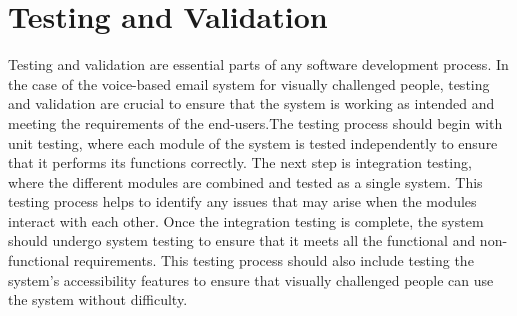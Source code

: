 \documentclass[12pt]{report}
\begin{document}
\section{Testing and Validation}
Testing and validation are essential parts of any software development process. In the case of the voice-based email system for visually challenged people, testing and validation are crucial to ensure that the system is working as intended and meeting the requirements of the end-users.The testing process should begin with unit testing, where each module of the system is tested independently to ensure that it performs its functions correctly. The next step is integration testing, where the different modules are combined and tested as a single system. This testing process helps to identify any issues that may arise when the modules interact with each other.\newline \newline
Once the integration testing is complete, the system should undergo system testing to ensure that it meets all the functional and non-functional requirements. This testing process should also include testing the system's accessibility features to ensure that visually challenged people can use the system without difficulty.\newline \newline
\end{document}
